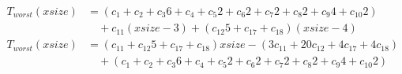 \begin{subequations}
\label{eq:analyse-argetconout-init}
\begin{align}
\label{eq:analyse-argetconout-init-1}
T_{worst}(\mathit{xsize})& = (c_{1} + c_{2} + c_{3}6 + c_{4} + c_{5}2 + c_{6}2 + c_{7}2 + c_{8}2 + c_{9}4 + c_{10}2)
\\
& \quad
+ c_{11}(\mathit{xsize} - 3)
+ (c_{12}5 + c_{17} + c_{18})(\mathit{xsize} - 4)
\nonumber \\
\label{eq:analyse-argetconout-init-2}
T_{worst}(\mathit{xsize})& =
(c_{11} + c_{12}5 + c_{17} + c_{18})\mathit{xsize}
- (3c_{11} + 20c_{12} + 4c_{17} + 4c_{18})
\\
& \quad
+  (c_{1} + c_{2} + c_{3}6 + c_{4} + c_{5}2 + c_{6}2 + c_{7}2 + c_{8}2 + c_{9}4 + c_{10}2)
\nonumber
\end{align}
\end{subequations}
